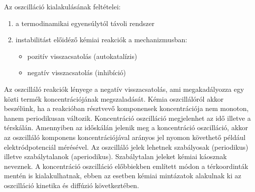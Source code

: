 
%
%
%
%
%

Az oszcilláció kialakulásának feltételei:
\begin{enumerate}
\item a termodinamikai egyensúlytól távoli rendszer
\item instabilitást előidéző kémiai reakciók a mechanizmusban:
 \begin{itemize}
\item pozitív visszacsatolás (autokatalízis)
\item negatív visszacsatolás (inhibíció)
\end{itemize}
\end{enumerate}

Az oszcilláló reakciók lényege a negatív visszacsatolás, ami megakadályozza egy közti termék koncentrációjának megszaladását.
Kémia oszcillálóról akkor beszélünk, ha a reakcióban résztvevő komponensek koncentrációja nem monoton, hanem periodikusan változik. Koncentráció oszcilláció megjelenhet az idő illetve a térskálán. Amennyiben az időskálán jelenik meg a koncentráció oszcilláció, akkor az oszcilláló komponens koncentrációjával arányos jel nyomon követhető például elektródpotenciál mérésével.
Az oszcilláló jelek lehetnek szabályosak (periodikus) illetve szabálytalanok (aperiodikus). Szabálytalan jeleket kémiai káosznak neveznek. A koncentráció oszcilláció előbbiekben említett módon a térkoordinták mentén is kialakulhatnak, ebben az esetben kémiai mintázatok alakulnak ki az oszcilláció kinetika és diffúzió következtében.\\

